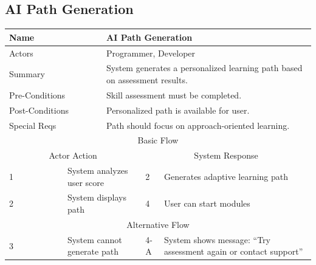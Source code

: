 \documentclass{FastFyp}
\begin{document}
\vspace{1em}

\subsection{AI Path Generation}
\noindent
\begin{minipage}{\textwidth}
\centering
{}
\label{tab:aipath}
\begin{tabular}{|p{}|p{}|p{}|p{}|p{}|}
\hline
\multicolumn{2}{|p{0.15\textwidth}|}{Name} &
  \multicolumn{3}{p{0.75\textwidth}|}{AI Path Generation} \\ \hline
\multicolumn{2}{|p{0.15\textwidth}|}{Actors} &
  \multicolumn{3}{p{0.75\textwidth}|}{Programmer, Developer} \\ \hline
\multicolumn{2}{|p{0.15\textwidth}|}{Summary} &
  \multicolumn{3}{p{0.75\textwidth}|}{System generates a personalized learning path based on assessment results.} \\ \hline
\multicolumn{2}{|p{0.15\textwidth}|}{Pre-Conditions} &
  \multicolumn{3}{p{0.75\textwidth}|}{Skill assessment must be completed.} \\ \hline
\multicolumn{2}{|p{0.15\textwidth}|}{Post-Conditions} &
  \multicolumn{3}{p{0.75\textwidth}|}{Personalized path is available for user.} \\ \hline
\multicolumn{2}{|p{0.15\textwidth}|}{Special Reqs} &
  \multicolumn{3}{p{0.75\textwidth}|}{Path should focus on approach-oriented learning.} \\ \hline
\multicolumn{5}{|c|}{Basic Flow} \\ \hline
\multicolumn{3}{|c|}{Actor Action} &
  \multicolumn{2}{c|}{System Response} \\ \hline
1 &
  \multicolumn{2}{p{0.42\textwidth}|}{System analyzes user score} &
  2 &
  Generates adaptive learning path \\ \hline
2 &
  \multicolumn{2}{p{0.42\textwidth}|}{System displays path} &
  4 &
  User can start modules \\ \hline
\multicolumn{5}{|c|}{Alternative Flow} \\ \hline
3 &
  \multicolumn{2}{p{0.42\textwidth}|}{System cannot generate path} &
  4-A &
  System shows message: “Try assessment again or contact support” \\ \hline
\end{tabular}
\end{minipage}
\end{document}
